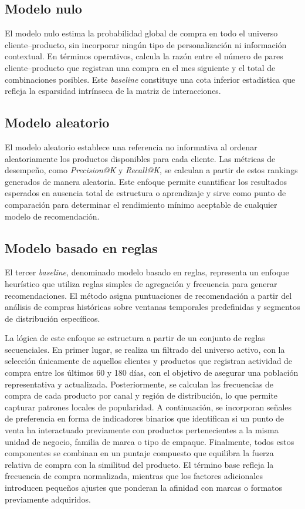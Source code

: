 \subsection{Modelo nulo}

El modelo nulo estima la probabilidad global de compra en todo el universo cliente–producto, sin incorporar ningún tipo de personalización ni información contextual. En términos operativos, calcula la razón entre el número de pares cliente–producto que registran una compra en el mes siguiente y el total de combinaciones posibles. Este \textit{baseline} constituye una cota inferior estadística que refleja la esparsidad intrínseca de la matriz de interacciones.

\subsection{Modelo aleatorio}

El modelo aleatorio establece una referencia no informativa al ordenar aleatoriamente los productos disponibles para cada cliente. Las métricas de desempeño, como \textit{Precision@K} y \textit{Recall@K}, se calculan a partir de estos rankings generados de manera aleatoria. Este enfoque permite cuantificar los resultados esperados en ausencia total de estructura o aprendizaje y sirve como punto de comparación para determinar el rendimiento mínimo aceptable de cualquier modelo de recomendación.

\subsection{Modelo basado en reglas}

El tercer \textit{baseline}, denominado modelo basado en reglas, representa un enfoque heurístico que utiliza reglas simples de agregación y frecuencia para generar recomendaciones.
El método asigna puntuaciones de recomendación a partir del análisis de compras históricas sobre ventanas temporales predefinidas y segmentos de distribución específicos.

La lógica de este enfoque se estructura a partir de un conjunto de reglas secuenciales. En primer lugar, se realiza un filtrado del universo activo, con la selección únicamente de aquellos clientes y productos que registran actividad de compra entre los últimos 60 y 180 días, con el objetivo de asegurar una población representativa y actualizada.
Posteriormente, se calculan las frecuencias de compra de cada producto por canal y región de distribución, lo que permite capturar patrones locales de popularidad.
A continuación, se incorporan señales de preferencia en forma de indicadores binarios que identifican si un punto de venta ha interactuado previamente con productos pertenecientes a la misma unidad de negocio, familia de marca o tipo de empaque.
Finalmente, todos estos componentes se combinan en un puntaje compuesto que equilibra la fuerza relativa de compra con la similitud del producto. El término base refleja la frecuencia de compra normalizada, mientras que los factores adicionales introducen pequeños ajustes que ponderan la afinidad con marcas o formatos previamente adquiridos.

